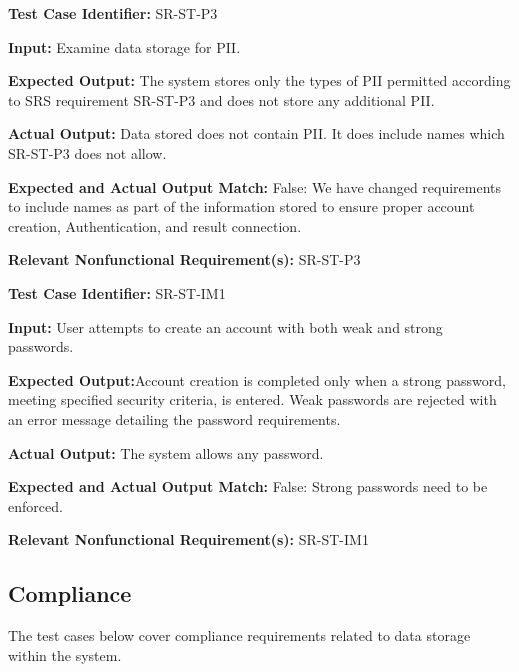 \documentclass[12pt, titlepage]{article}
\begin{document}
\begin{mdframed}[linewidth=0.5mm] \par
  \textbf{Test Case Identifier:} SR-ST-P3 \par
  \textbf{Input:} Examine data storage for PII. \par 
  \textbf{Expected Output:}  The system stores only the types of PII permitted according to SRS requirement SR-ST-P3 and does not store any additional PII. \par  
  \textbf{Actual Output:} Data stored does not contain PII. It does include names which SR-ST-P3 does not allow. \par
  \textbf{Expected and Actual Output Match:} False: We have changed requirements to include names as part of the information stored to ensure proper account creation, 
  Authentication, and result connection. \par
  \textbf{Relevant Nonfunctional Requirement(s):} SR-ST-P3
\end{mdframed}

\begin{mdframed}[linewidth=0.5mm] \par
  \textbf{Test Case Identifier:} SR-ST-IM1 \par
  \textbf{Input:} User attempts to create an account with both weak and
  strong passwords. \par 
  \textbf{Expected Output:}Account creation is completed only when a strong password,
  meeting specified security criteria, is entered. Weak passwords are rejected with
  an error message detailing the password requirements. \par  
  \textbf{Actual Output:} The system allows any password. \par
  \textbf{Expected and Actual Output Match:} False: Strong passwords need to be enforced. \par
  \textbf{Relevant Nonfunctional Requirement(s):} SR-ST-IM1
\end{mdframed}

\newpage{}

\subsection{Compliance}
\hspace{2em}The test cases below cover compliance requirements related to data storage within the system. 
\end{document}
